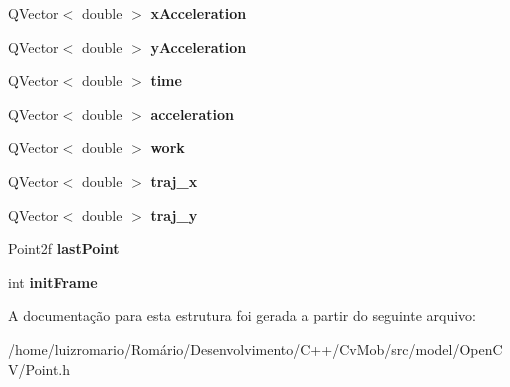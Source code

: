 \begin{DoxyCompactItemize}
\item 
\hypertarget{structpoint_aa2ddb8c5f7b1fe833ed67813ab1518f7}{
QVector$<$ double $>$ {\bfseries xAcceleration}}
\label{structpoint_aa2ddb8c5f7b1fe833ed67813ab1518f7}

\item 
\hypertarget{structpoint_a335238bc248464d62d7fa15d5dc1d7cb}{
QVector$<$ double $>$ {\bfseries yAcceleration}}
\label{structpoint_a335238bc248464d62d7fa15d5dc1d7cb}

\item 
\hypertarget{structpoint_af9b0e846d52b99a1766f6f001b02d0f4}{
QVector$<$ double $>$ {\bfseries time}}
\label{structpoint_af9b0e846d52b99a1766f6f001b02d0f4}

\item 
\hypertarget{structpoint_a0a7663a57dfff7dea675ff25030e4aad}{
QVector$<$ double $>$ {\bfseries acceleration}}
\label{structpoint_a0a7663a57dfff7dea675ff25030e4aad}

\item 
\hypertarget{structpoint_afb6e9d3acdef6581d9bab09577a75454}{
QVector$<$ double $>$ {\bfseries work}}
\label{structpoint_afb6e9d3acdef6581d9bab09577a75454}

\item 
\hypertarget{structpoint_a69bd4698e3812ec0cc68eda4bd4c662a}{
QVector$<$ double $>$ {\bfseries traj\_\-x}}
\label{structpoint_a69bd4698e3812ec0cc68eda4bd4c662a}

\item 
\hypertarget{structpoint_a479bcca00b63d3d2940da70536eb42d9}{
QVector$<$ double $>$ {\bfseries traj\_\-y}}
\label{structpoint_a479bcca00b63d3d2940da70536eb42d9}

\item 
\hypertarget{structpoint_add7173bd502f2e12aa4939b1a685994e}{
Point2f {\bfseries lastPoint}}
\label{structpoint_add7173bd502f2e12aa4939b1a685994e}

\item 
\hypertarget{structpoint_ade29669618b6d0df0fbde258b3eb4341}{
int {\bfseries initFrame}}
\label{structpoint_ade29669618b6d0df0fbde258b3eb4341}

\end{DoxyCompactItemize}


A documentação para esta estrutura foi gerada a partir do seguinte arquivo:\begin{DoxyCompactItemize}
\item 
/home/luizromario/Romário/Desenvolvimento/C++/CvMob/src/model/OpenCV/Point.h\end{DoxyCompactItemize}
